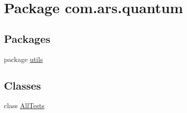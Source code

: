 \hypertarget{namespacecom_1_1ars_1_1quantum}{}\section{Package com.\+ars.\+quantum}
\label{namespacecom_1_1ars_1_1quantum}
\subsection*{Packages}
\begin{DoxyCompactItemize}
\item 
package \hyperlink{namespacecom_1_1ars_1_1quantum_1_1utils}{utils}
\end{DoxyCompactItemize}
\subsection*{Classes}
\begin{DoxyCompactItemize}
\item 
class \hyperlink{classcom_1_1ars_1_1quantum_1_1_all_tests}{All\+Tests}
\end{DoxyCompactItemize}
